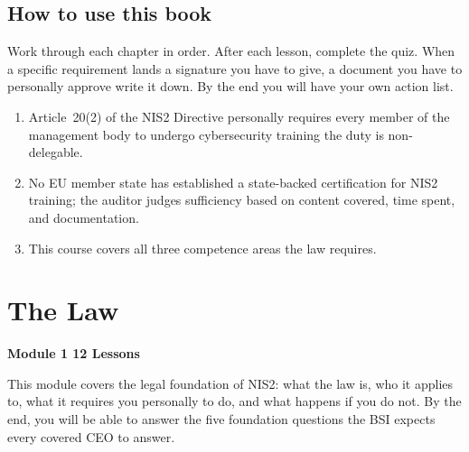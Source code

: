\documentclass[11pt,a4paper,twoside]{book}
\begin{document}
\section*{How to use this book}

Work through each chapter in order. After each lesson, complete the quiz. When a specific requirement lands a signature you have to give, a document you have to personally approve write it down. By the end you will have your own action list.

\begin{keytakeaways}
\begin{enumerate}
\item Article~20(2) of the NIS2 Directive personally requires every member of the management body to undergo cybersecurity training the duty is non-delegable.
  \item No EU member state has established a state-backed certification for NIS2 training; the auditor judges sufficiency based on content covered, time spent, and documentation.
  \item This course covers all three competence areas the law requires.
\end{enumerate}
\end{keytakeaways}

\newpage


\chapter{The Law}

\begin{moduleintro}
\textbf{Module 1 12 Lessons}

This module covers the legal foundation of NIS2: what the law is, who it applies to, what it requires you personally to do, and what happens if you do not. By the end, you will be able to answer the five foundation questions the BSI expects every covered CEO to answer.
\end{moduleintro}

\bigskip

\end{document}
